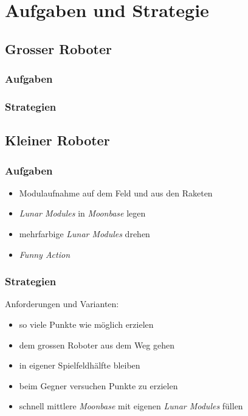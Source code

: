 \section{Aufgaben und Strategie}
\subsection{Grosser Roboter}

\begin{frame}
	\frametitle{Aufgaben}
	
\end{frame}

\begin{frame}
	\frametitle{Strategien}
	
\end{frame}

\subsection{Kleiner Roboter}

\begin{frame}
	\frametitle{Aufgaben}
	\begin{itemize}
		\item Modulaufnahme auf dem Feld und aus den Raketen
		\item \textit{Lunar Modules} in \textit{Moonbase} legen
		\item mehrfarbige \textit{Lunar Modules} drehen
		\item \textit{Funny Action}
	\end{itemize}
\end{frame}

\begin{frame}
	\frametitle{Strategien}
	Anforderungen und Varianten:
	\begin{itemize}
		\item so viele Punkte wie möglich erzielen
		\item dem grossen Roboter aus dem Weg gehen
	\end{itemize}
	\begin{itemize}
		\item in eigener Spielfeldhälfte bleiben
		\item beim Gegner versuchen Punkte zu erzielen
		\item schnell mittlere \textit{Moonbase} mit eigenen \textit{Lunar Modules} füllen
	\end{itemize}
	
\end{frame}
